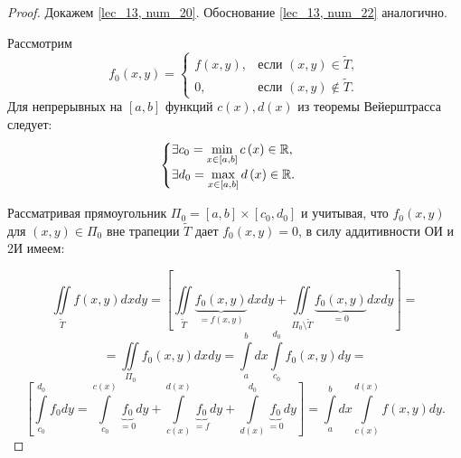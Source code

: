 \documentclass[../../main.tex]{subfiles}
\begin{document}
\begin{proof}
	Докажем \eqref {lec_13, num_20}. Обоснование \eqref {lec_13, num_22}
	аналогично.
	
	Рассмотрим 
	\[ 
	f_0 \left( x, y \right) =  
	\begin{cases}
	f \left( x, y \right), &\text{если } \left( x, y \right)
	\in \widetilde{T}, \\
	0, &\text{если } \left( x, y \right)
	\notin \widetilde{T}.
	\end{cases}
	\]
	Для непрерывных на $ \left[ a, b \right] $ функций 
	$ c \left( x \right), d \left( x \right) $ из теоремы Вейерштрасса следует:
	\[\begin{cases}
	\exists c_0 = 
	\min\limits_{x \in \left[ a, b \right] } c \left( x \right) \in \mathbb{R}, \\
	\exists d_0 = \max\limits_{x \in \left[a, b \right] } d \left(x\right) \in \mathbb{R}.
	\end{cases}\]
	
	Рассматривая прямоугольник $\Pi_0 = \left[ a, b \right] \times 
	\left[ c_0, d_0 \right]  $ и учитывая, что $ f_0 \left( x, y \right) $ для 
	$ \left( x, y \right) \in \Pi_0 $ вне трапеции $\widetilde{T}$ дает
	$ f_0 \left( x, y \right) = 0 $, в силу аддитивности ОИ и 2И имеем:
	
	\[
	\iint\limits_{ \widetilde{T} } f \left( x, y \right) dx dy = \left[
	\iint\limits_{ \widetilde{T} } 
	\underbrace{f_0 \left( x, y \right)}_{= f \left( x, y \right)} dx dy
    +
	\iint\limits_{ \Pi_0 \setminus \widetilde{T} }
	\underbrace{f_0 \left( x, y \right)}_{= 0} dx dy
	\right] =
	\]
	\[
	= \iint\limits_{ \Pi_0} f_0 \left( x, y \right) dx dy = 
	\int\limits_a^b dx
	\int\limits_{c_0}^{d_0} f_0 \left( x, y \right) dy = 
	\]
	\[
	\left[ \int\limits_{c_0}^{d_0} f_0 dy =
	 \int\limits_{c_0} ^ {c \left( x \right) } 
	\underbrace{f_0}_{ = 0}  dy + 
	\int\limits_{c \left( x \right) } ^ {d \left( x \right) } 
	\underbrace{f_0}_{ = f} dy +
	 \int\limits_{d \left( x \right) } ^ {d_0} 
	\underbrace{f_0}_{ = 0} dy \right] = 
	\int\limits_a^b dx \int\limits_{c \left( x \right) } ^
	{d \left( x \right) } f \left( x, y \right) dy.
	\]
\end{proof}
\end{document}

